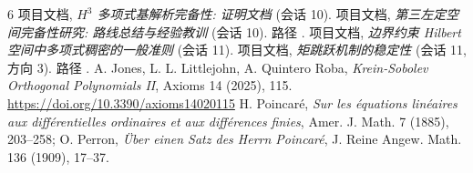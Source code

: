 \documentclass[UTF8]{ctexart}
\begin{document}
\begin{thebibliography}{6}
 项目文档, \emph{$H^3$ 多项式基解析完备性: 证明文档} (会话 10).
 项目文档, \emph{第三左定空间完备性研究: 路线总结与经验教训} (会话 10).
	路径 .
 项目文档, \emph{边界约束 Hilbert 空间中多项式稠密的一般准则} (会话 11).
 项目文档, \emph{矩跳跃机制的稳定性} (会话 11, 方向 3).
	路径 .
 A. Jones, L. L. Littlejohn, A. Quintero Roba, \emph{Krein-Sobolev
	Orthogonal Polynomials II}, Axioms 14 (2025), 115.
	\url{https://doi.org/10.3390/axioms14020115}
 H. Poincar\'e, \emph{Sur les \'equations lin\'eaires aux
	diff\'erentielles ordinaires et aux diff\'erences finies}, Amer. J. Math.
	7 (1885), 203--258; O. Perron, \emph{\"Uber einen Satz des Herrn Poincar\'e},
	J. Reine Angew. Math. 136 (1909), 17--37.
\end{thebibliography}
\end{document}
